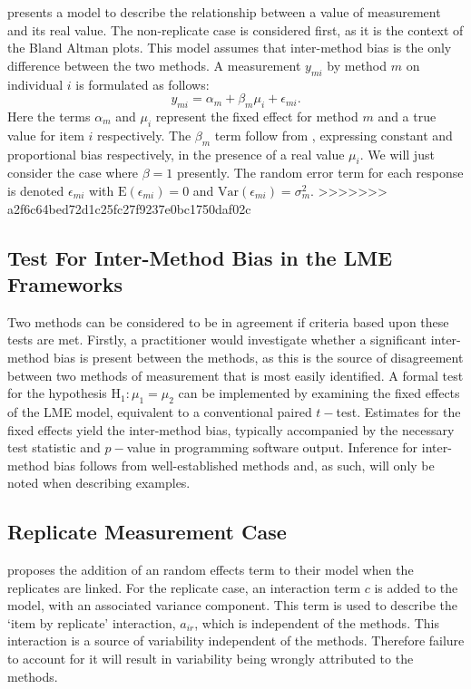 \documentclass[12pt, a4paper]{report}
\theoremstyle{plain}
\theoremstyle{definition}
\theoremstyle{remark}
\begin{document}
\citet{BXC2004} presents a model to describe the relationship between a value of measurement and its real value. The non-replicate case is considered first, as it is the context of the Bland Altman plots. This model assumes that inter-method bias is the only difference between the two methods. A measurement $y_{mi}$ by method $m$ on individual $i$ is formulated as follows:
\begin{equation}
y_{mi}  = \alpha_{m} + \beta_m\mu_{i} + \epsilon_{mi}.
\end{equation}
Here the terms $\alpha_{m}$ and $\mu_{i}$ represent the fixed effect for method $m$ and a true value for item $i$ respectively.  The $\beta_{m}$ term follow from \citet{DunnSEME}, expressing constant and proportional bias respectively, in the presence of a real value $\mu_{i}.$ We will just consider the case where $\beta=1$ presently. The random error term for each response is denoted $\epsilon_{mi}$ with $\mathrm{E}(\epsilon_{mi})=0$ and $\mathrm{Var}(\epsilon_{mi})=\sigma^2_m$.
>>>>>>> a2f6c64bed72d1c25fc27f9237e0bc1750daf02c
 
\subsection{Test For Inter-Method Bias in the LME Frameworks}
 Two methods can be considered to be in agreement if criteria based upon these tests are met. Firstly, a practitioner would investigate whether a significant inter-method bias is present between the methods, as this is the source of disagreement between two methods of measurement that is most easily identified. A formal test for the hypothesis $\operatorname{H_1} : \mu_1 = \mu_2$ can be implemented by examining the fixed effects of the LME model, equivalent to a conventional paired $t-$test. Estimates for the fixed effects yield the inter-method bias, typically accompanied by the necessary test statistic and $p-$value in programming software output. Inference for inter-method bias follows from well-established methods and, as such, will only be noted when describing examples.

\subsection*{Replicate Measurement Case}

\citet{BXC2008} proposes the addition of an random effects term to their model when the replicates are linked. For the replicate case, an interaction term $c$ is added to the model, with an associated variance component. This term is used to describe the `item by replicate' interaction, $a_{ir}$, which is independent of the methods. This interaction is a source of variability independent of the methods. Therefore failure to account for it will result in variability being wrongly attributed to the methods.
\end{document}

